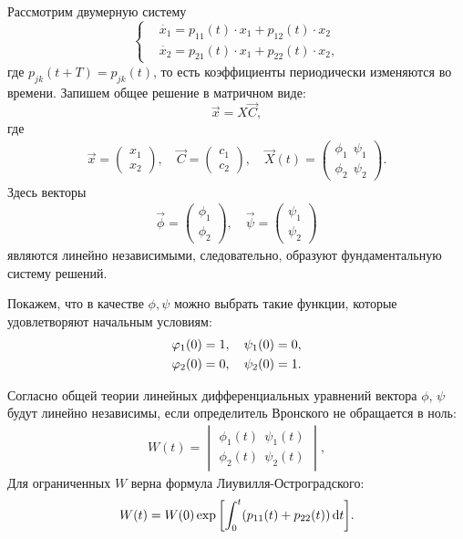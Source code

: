 Рассмотрим двумерную систему
\begin{equation}
	\left\{\begin{aligned}
		&\dot{x_1}=p_{11}(t)\cdot x_1+p_{12}(t)\cdot x_2 \\
		&\dot{x_2}=p_{21}(t)\cdot x_1+p_{22}(t)\cdot x_2,	
	\end{aligned}\right.
	\label{eq:47}
\end{equation}
где $p_{jk}(t+T)=p_{jk}(t)$, то есть  коэффициенты периодически изменяются во времени. Запишем общее решение в матричном виде:
\begin{equation*}
	\vec{x} = X \vec{C}, 
\end{equation*}
где
\begin{gather*}
	\vec{x}= 
	\begin{pmatrix}
		x_1 \\
		x_2
	\end{pmatrix}
	,\quad
	\vec{C}= 
	\begin{pmatrix}
		c_1 \\
		c_2
	\end{pmatrix}
	,\quad
	\vec{X}(t)= 
	\begin{pmatrix}
		\phi_1 ~~  \psi_1 \\
		\phi_2  ~~ \psi_2
	\end{pmatrix}.
\end{gather*}
Здесь векторы
\begin{gather*}
	\vec{\phi}= 
	\begin{pmatrix}
		\phi_1 \\
		\phi_2
	\end{pmatrix}
	,\quad
	\vec{\psi}= 
	\begin{pmatrix}
		\psi_1 \\
		\psi_2
	\end{pmatrix}
\end{gather*}
являются линейно независимыми, следовательно, образуют фундаментальную систему решений. 

Покажем, что в качестве $\phi,\psi$ можно выбрать такие функции, которые удовлетворяют начальным условиям:
\begin{gather}
	\phi_1(0)=1,\quad \psi_1(0)=0, \notag \\ 
	\phi_2(0)=0,\quad \psi_2(0)=1.		
	\label{eq:48}
\end{gather}

Согласно общей теории линейных дифференциальных уравнений вектора $\phi$, $\psi$  будут линейно независимы, если определитель Вронского не обращается в ноль:
\begin{gather*}
	W(t)= 
	\begin{vmatrix}
		\phi_1(t) ~~\psi_1(t) \\ 
		\phi_2(t) ~~\psi_2(t)
	\end{vmatrix}
	,
\end{gather*}
Для ограниченных $W$ верна формула Лиувилля-Остроградского:
\begin{equation}
	W(t)=W(0)\exp\qty[\int_0^t(p_{11}(t)+p_{22}(t))\dd{t}].
	\label{eq:49}	
\end{equation}

